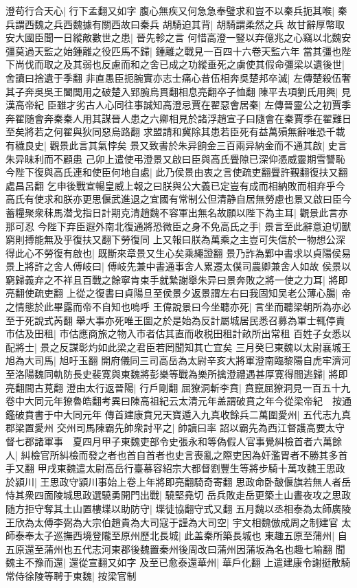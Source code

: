 澄苟行合天心|{
	行下孟翻又如字}
腹心無疾又何急急奉璧求和豈不以秦兵扼其喉|{
	秦兵謂西魏之兵西魏據有關西故曰秦兵}
胡騎迫其背|{
	胡騎謂柔然之兵}
故甘辭厚幣取安大國臣聞一日縱敵數世之患|{
	晉先軫之言}
何惜高澄一豎以弃億兆之心竊以北魏安彊莫過天監之始鍾離之役匹馬不歸|{
	鍾離之戰見一百四十六卷天監六年}
當其彊也陛下尚伐而取之及其弱也反慮而和之舍已成之功縱垂死之虜使其假命彊梁以遺後世|{
	舍讀曰捨遺于季翻}
非直愚臣扼腕實亦志士痛心昔伍相奔吳楚邦卒滅|{
	左傳楚殺伍奢其子奔吳吳王闔閭用之破楚入郢腕烏貫翻相息亮翻卒子恤翻}
陳平去項劉氏用興|{
	見漢高帝紀}
臣雖才劣古人心同往事誠知高澄忌賈在翟惡會居秦|{
	左傳晉靈公之初賈季奔翟随會奔秦秦人用其謀晉人患之六卿相見於諸浮趙宣子曰隨會在秦賈季在翟難日至矣將若之何翟與狄同惡烏路翻}
求盟請和冀除其患若臣死有益萬殞無辭唯恐千載有穢良史|{
	觀景此言其氣悖矣}
景又致書於朱异餉金三百兩异納金而不通其啟|{
	史言朱异昧利而不顧患}
己卯上遣使弔澄景又啟曰臣與高氏舋隙已深仰憑威靈期雪讐恥今陛下復與高氏連和使臣何地自處|{
	此乃侯景由衷之言使疏吏翻舋許覲翻復扶又翻處昌呂翻}
乞申後戰宣暢皇威上報之曰朕與公大義已定豈有成而相納敗而相弃乎今高氏有使求和朕亦更思偃武進退之宜國有常制公但清静自居無勞慮也景又啟曰臣今蓄糧聚衆秣馬潜戈指日計期克清趙魏不容軍出無名故願以陛下為主耳|{
	觀景此言亦那可忍}
今陛下弃臣遐外南北復通將恐微臣之身不免高氏之手|{
	景言至此辭意迫切獸窮則搏能無及乎復扶又翻下勞復同}
上又報曰朕為萬乘之主豈可失信於一物想公深得此心不勞復有啟也|{
	既斷來章景又生心矣乘繩證翻}
景乃詐為鄴中書求以貞陽侯易景上將許之舍人傅岐曰|{
	傅岐先兼中書通事舍人累遷太僕司農卿兼舍人如故}
侯景以窮歸義弃之不祥且百戰之餘寧肯束手就縶謝舉朱异曰景奔敗之將一使之力耳|{
	將即亮翻使疏吏翻}
上從之復書曰貞陽旦至侯景夕返景謂左右曰我固知吴老公薄心腸|{
	帝之情態於此畢露而帝不自知也嗚呼}
王偉說景曰今坐聽亦死|{
	言坐而聽梁朝所為亦必至于死說式芮翻}
舉大事亦死唯王圖之於是始為反計屬城居民悉召募為軍士輒停責市估及田租|{
	市估應商旅之物入市者估其直而收税田租計畝所出常租}
百姓子女悉以配將士|{
	景之反謀彰灼如此梁之君臣若罔聞知其亡宜矣}
三月癸巳東魏以太尉襄城王旭為大司馬|{
	旭吁玉翻}
開府儀同三司高岳為太尉辛亥大將軍澄南臨黎陽自虎牢濟河至洛陽魏同軌防長史裴寛與東魏將彭樂等戰為樂所擒澄禮遇甚厚寛得間逃歸|{
	將即亮翻間古莧翻}
澄由太行返晉陽|{
	行戶剛翻}
屈獠洞斬李賁|{
	賁竄屈獠洞見一百五十九卷中大同元年獠魯皓翻考異曰陳高祖紀云太清元年盖謂破賁之年今從梁帝紀　按通鑑破賁書于中大同元年}
傳首建康賁兄天寶遁入九真收餘兵二萬圍愛州|{
	五代志九真郡梁置愛州}
交州司馬陳霸先帥衆討平之|{
	帥讀曰率}
詔以霸先為西江督護高要太守督七郡諸軍事　夏四月甲子東魏吏部令史張永和等偽假人官事覺糾檢首者六萬餘人|{
	糾檢官所糾檢而發之者也首自首者也史言喪亂之際吏因為奸濫胃者不勝其多首手又翻}
甲戌東魏遣太尉高岳行臺慕容紹宗大都督劉豐生等將步騎十萬攻魏王思政於潁川|{
	王思政守潁川事始上卷上年將即亮翻騎奇寄翻}
思政命卧皷偃旗若無人者岳恃其衆四面陵城思政選驍勇開門出戰|{
	驍堅堯切}
岳兵敗走岳更築土山晝夜攻之思政随方拒守奪其土山置樓堞以助防守|{
	堞徒協翻守式又翻}
五月魏以丞相泰為太師廣陵王欣為太傅李弼為大宗伯趙貴為大司寇于謹為大司空|{
	宇文相魏倣成周之制建官}
太師泰奉太子巡撫西境登隴至原州歷北長城|{
	此盖秦所築長城也}
東趣五原至蒲州|{
	自五原還至蒲州也五代志河東郡後魏置秦州後周改曰蒲州因蒲坂為名也趣七喻翻}
聞魏主不豫而還|{
	還從宣翻又如字}
及至已愈泰還華州|{
	華戶化翻}
上遣建康令謝挺散騎常侍徐陵等聘于東魏|{
	按梁官制}


